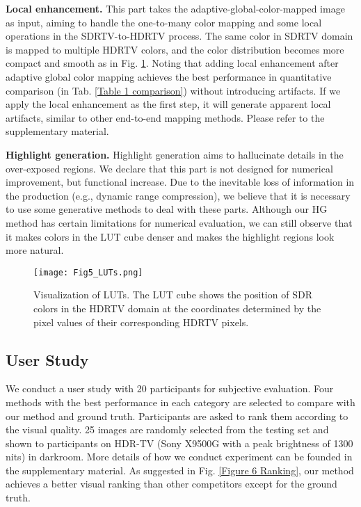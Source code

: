 \documentclass[10pt,twocolumn,letterpaper]{article}
\begin{document}
\textbf{Local enhancement.} This part takes the adaptive-global-color-mapped image as input, aiming to handle the one-to-many color mapping and some local operations in the SDRTV-to-HDRTV process. The same color in SDRTV domain is mapped to multiple HDRTV colors, and the color distribution becomes more compact and smooth as in Fig. \ref{Figure 5 LUTs}. Noting that adding local enhancement after adaptive global color mapping achieves the best performance in quantitative comparison (in Tab. \ref{Table 1 comparison}) without introducing artifacts. If we apply the local enhancement as the first step, it will generate apparent local artifacts, similar to other end-to-end mapping methods. Please refer to the supplementary material.

\textbf{Highlight generation.} Highlight generation aims to hallucinate details in the over-exposed regions. We declare that this part is not designed for numerical improvement, but functional increase. Due to the inevitable loss of information in the production (e.g., dynamic range compression), we believe that it is necessary to use some generative methods to deal with these parts. Although our HG method has certain limitations for numerical evaluation, we can still observe that it makes colors in the LUT cube denser and makes the highlight regions look more natural. 

\begin{figure}[!t]
   \begin{center}
\texttt{[image: Fig5\_LUTs.png]}
   \end{center}
    \vspace{-10pt}
      \caption{Visualization of LUTs. The LUT cube shows the position of SDR colors in the HDRTV domain at the coordinates determined by the pixel values of their corresponding HDRTV pixels.}
   \label{Figure 5 LUTs}
   \vspace{-10pt}
\end{figure}

\subsection{User Study}
We conduct a user study with 20 participants for subjective evaluation. Four methods with the best performance in each category are selected to compare with our method and ground truth. Participants are asked to rank them according to the visual quality. 25 images are randomly selected from the testing set and shown to participants on HDR-TV (Sony X9500G with a peak brightness of 1300 nits) in darkroom. More details of how we conduct experiment can be founded in the supplementary material. As suggested in Fig. \ref{Figure 6 Ranking}, our method achieves a better visual ranking than other competitors except for the ground truth. 
\end{document}

